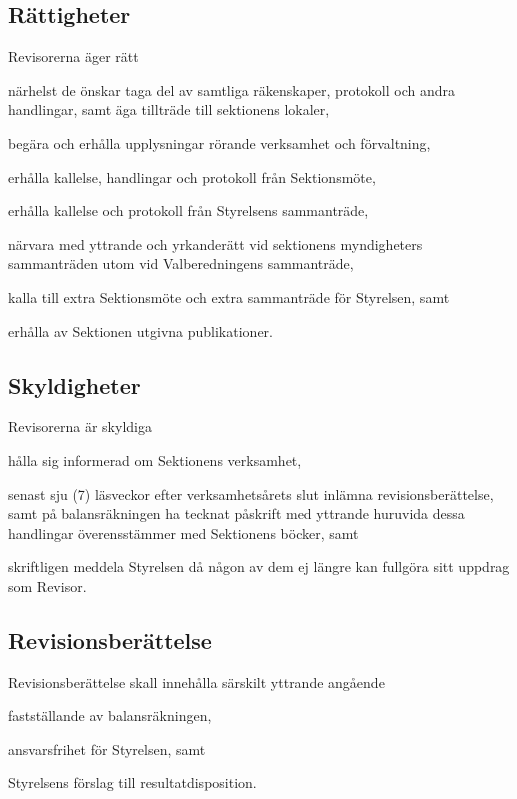 \documentclass[10pt]{article}
\begin{document}
\subsection{Rättigheter}
Revisorerna äger rätt
\begin{attlist}
\item närhelst de önskar taga del av samtliga räkenskaper, protokoll och
    andra handlingar, samt äga tillträde till sektionens lokaler,
\item begära och erhålla upplysningar rörande verksamhet och förvaltning,
\item erhålla kallelse, handlingar och protokoll från Sektionsmöte,
\item erhålla kallelse och protokoll från Styrelsens sammanträde,
\item närvara med yttrande och yrkanderätt vid sektionens myndigheters
    sammanträden utom vid Valberedningens sammanträde,
\item kalla till extra Sektionsmöte och extra sammanträde för Styrelsen, samt
\item erhålla av Sektionen utgivna publikationer.
\end{attlist}

\subsection{Skyldigheter}
Revisorerna är skyldiga
\begin{attlist}
\item hålla sig informerad om Sektionens verksamhet,
\item senast sju (7) läsveckor efter verksamhetsårets slut inlämna
    revisionsberättelse, samt på balansräkningen ha tecknat påskrift med
    yttrande huruvida dessa handlingar överensstämmer med Sektionens böcker,
    samt
\item skriftligen meddela Styrelsen då någon av dem ej längre kan fullgöra
    sitt uppdrag som Revisor.
\end{attlist}

\subsection{Revisionsberättelse}
Revisionsberättelse skall innehålla särskilt yttrande angående
\begin{alphlist}
\item fastställande av balansräkningen,
\item ansvarsfrihet för Styrelsen, samt
\item Styrelsens förslag till resultatdisposition.
\end{alphlist}
\newpage
\end{document}
